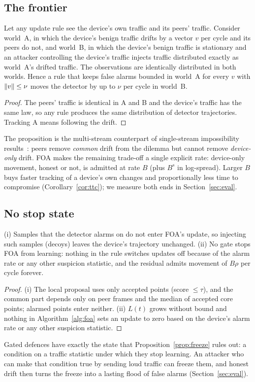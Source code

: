 \subsection{The frontier}
\begin{proposition}\label{prop:frontier}
Let any update rule see the device's own traffic and its peers' traffic. Consider world~A, in which the
device's benign traffic drifts by a vector $v$ per cycle and its peers do not, and world~B, in which the
device's benign traffic is stationary and an attacker controlling the device's traffic injects
traffic distributed exactly as world~A's drifted traffic. The observations are identically
distributed in both worlds. Hence a rule that keeps false alarms bounded in world~A for every $v$ with
$\left\lVert v \right\rVert\le\nu$ moves the detector by up to $\nu$ per cycle in world~B.
\end{proposition}
\begin{proof}
The peers' traffic is identical in A and B and the device's traffic has the same law, so any rule
produces the same distribution of detector trajectories. Tracking A means following the drift.
\end{proof}
The proposition is the multi-stream counterpart of single-stream impossibility results~\cite{warden}:
peers remove \emph{common} drift from the dilemma but cannot remove \emph{device-only} drift. FOA makes
the remaining trade-off a single explicit rate: device-only movement, honest or not, is admitted at
rate $B$ (plus $B^s$ in log-spread). Larger $B$ buys faster tracking of a device's own changes and
proportionally less time to compromise (Corollary~\ref{cor:ttc}); we measure both ends in
Section~\ref{sec:eval}.

\subsection{No stop state}
\begin{proposition}\label{prop:freeze}
(i) Samples that the detector alarms on do not enter FOA's update, so injecting such samples
(decoys) leaves the device's trajectory unchanged. (ii) No gate stops FOA from learning: nothing in the
rule switches updates off because of the alarm rate or any other suspicion statistic, and the residual
admits movement of $B\rho$ per cycle forever.
\end{proposition}
\begin{proof}
(i) The local proposal uses only accepted points (score $\le\tau$), and the common part depends only on
peer frames and the median of accepted core points; alarmed points enter neither. (ii) $L(t)$ grows
without bound and nothing in Algorithm~\ref{alg:foa} sets an update to zero based on the device's
alarm rate or any other suspicion statistic.
\end{proof}
Gated defences have exactly the state that Proposition~\ref{prop:freeze} rules out: a condition on a
traffic statistic under which they stop learning. An attacker who can make that condition true by
sending loud traffic can freeze them, and honest drift then turns the freeze into a lasting flood of
false alarms (Section~\ref{sec:eval}).


